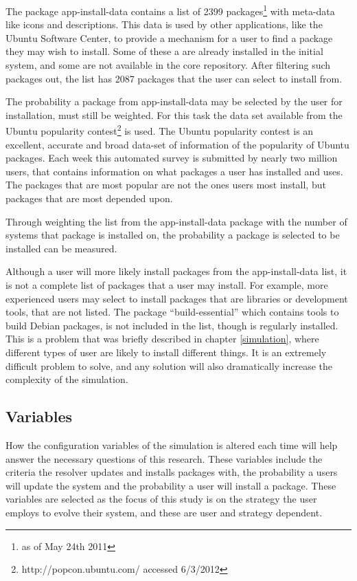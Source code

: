The package app-install-data contains a list of 2399 packages\footnote{as of May 24th 2011} with meta-data like icons and descriptions.
This data is used by other applications, like the Ubuntu Software Center, to provide a mechanism for a user to find a package they may wish to install.
Some of these a are already installed in the initial system, and some are not available in the core repository.
After filtering such packages out, the list has 2087 packages that the user can select to install from. 

The probability a package from app-install-data may be selected by the user for installation, must still be weighted.
For this task the data set available from the Ubuntu popularity contest\footnote{http://popcon.ubuntu.com/ accessed 6/3/2012} is used.
The Ubuntu popularity contest is an excellent, accurate and broad data-set of information of the popularity of Ubuntu packages.
Each week this automated survey is submitted by nearly two million users, that contains information on what packages a user has installed and uses.
The packages that are most popular are not the ones users most install, but packages that are most depended upon.

Through weighting the list from the app-install-data package with the number of systems that package is installed on,
the probability a package is selected to be installed can be measured.

Although a user will more likely install packages from the app-install-data list, it is not a complete list of packages that a user may install. 
For example, more experienced users may select to install packages that are libraries or development tools, that are not listed.
The package ``build-essential'' which contains tools to build Debian packages, is not included in the list, though is regularly installed.
This is a problem that was briefly described in chapter \ref{simulation}, where different types of user are likely to install different things.
It is an extremely difficult problem to solve, and any solution will also dramatically increase the complexity of the simulation.

\subsection{Variables}
How the configuration variables of the simulation is altered each time will help answer the necessary questions of this research.
These variables include the criteria the resolver updates and installs packages with,
the probability a users will update the system and the probability a user will install a package.
These variables are selected as the focus of this study is on the strategy the user employs to evolve their system,
and these are user and strategy dependent.


